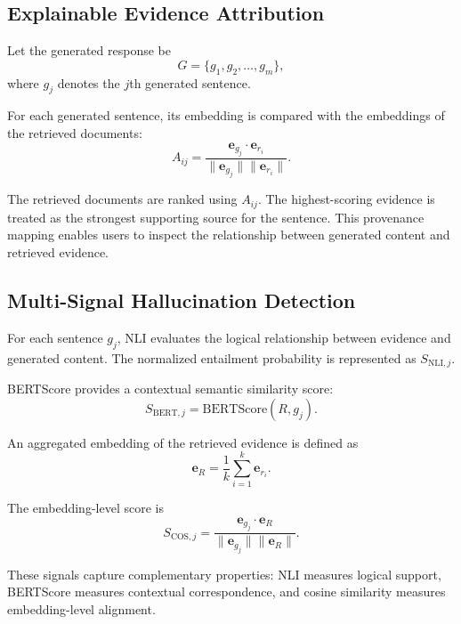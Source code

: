 \documentclass[conference]{IEEEtran}
\begin{document}
\subsection{Explainable Evidence Attribution}

Let the generated response be
\begin{equation}
G=\{g_1,g_2,\ldots,g_m\},
\end{equation}
where $g_j$ denotes the $j$th generated sentence.

For each generated sentence, its embedding is compared with the embeddings of the retrieved documents:
\begin{equation}
A_{ij}=
\frac{\mathbf{e}_{g_j}\cdot\mathbf{e}_{r_i}}
{\|\mathbf{e}_{g_j}\|\|\mathbf{e}_{r_i}\|}.
\end{equation}

The retrieved documents are ranked using $A_{ij}$. The highest-scoring evidence is treated as the strongest supporting source for the sentence. This provenance mapping enables users to inspect the relationship between generated content and retrieved evidence.

\subsection{Multi-Signal Hallucination Detection}

For each sentence $g_j$, NLI evaluates the logical relationship between evidence and generated content. The normalized entailment probability is represented as $S_{\mathrm{NLI},j}$.

BERTScore provides a contextual semantic similarity score:
\begin{equation}
S_{\mathrm{BERT},j}=\mathrm{BERTScore}(R,g_j).
\end{equation}

An aggregated embedding of the retrieved evidence is defined as
\begin{equation}
\mathbf{e}_R=\frac{1}{k}\sum_{i=1}^{k}\mathbf{e}_{r_i}.
\end{equation}

The embedding-level score is
\begin{equation}
S_{\mathrm{COS},j}=
\frac{\mathbf{e}_{g_j}\cdot\mathbf{e}_R}
{\|\mathbf{e}_{g_j}\|\|\mathbf{e}_R\|}.
\end{equation}

These signals capture complementary properties: NLI measures logical support, BERTScore measures contextual correspondence, and cosine similarity measures embedding-level alignment.
\end{document}
